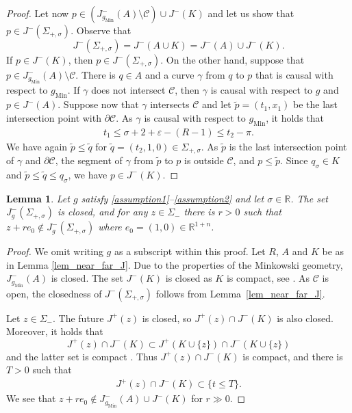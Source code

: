 \documentclass[11pt,letterpaper]{amsart}
\newtheorem{Lemma}[Theorem]{Lemma}
\theoremstyle{definition}
\numberwithin{equation}{section}
\newcommand{\eps}{\varepsilon}
\newcommand{\p}{\partial}
\newcommand{\gm}{g_{\mathrm{Min}}}
\def\p{\partial}
\def\R{\mathbb R}
\begin{document}
\begin{proof}
Let now $p \in (J_{\gm}^-(A) \setminus \mathcal C) \cup J^-(K)$
and let us show that $p \in J^-(\Sigma_{+,\sigma})$. Observe that 
\[
J^-(\Sigma_{+,\sigma}) = J^-(A \cup K) = J^-(A) \cup J^-(K).
\]
If $p \in J^-(K)$, then $p \in J^-(\Sigma_{+,\sigma})$. On the other hand, suppose that 
$p \in J_{\gm}^-(A) \setminus \mathcal C$.
There is $q \in A$ and a curve $\gamma$ from $q$ to $p$ that is causal with respect to $\gm$. 
If $\gamma$ does not intersect $\mathcal C$, then $\gamma$ is causal with respect to $g$ and $p \in J^-(A)$.
Suppose now that $\gamma$ intersects $\mathcal C$ and let $\tilde p = (t_1,x_1)$ be the last intersection point with $\p \mathcal C$. As $\gamma$ is causal with respect to $\gm$, it holds that 
    \begin{align*}
t_1 \leq \sigma + 2 + \eps - (R-1) \leq t_2 - \pi.
    \end{align*}
We have again $\tilde p \le \tilde q$ for $\tilde q = (t_2, 1, 0) \in \Sigma_{+,\sigma}$. As $\tilde p$ is the last intersection point of $\gamma$ and $\p \mathcal C$, the segment of $\gamma$ from $\tilde p$ to $p$ is outside $\mathcal C$, and $p \le \tilde p$.
Since $q_\sigma \in K$ and $\tilde p \le \tilde q \le q_\sigma$, we have $p \in J^-(K)$.
\end{proof}


\begin{Lemma}\label{lem_cl_bdd}
Let $g$ satisfy \eqref{assumption1}--\eqref{assumption2} and let $\sigma \in \R$.
The set $J_{g}^-(\Sigma_{+,\sigma})$ is closed, and 
for any $z \in \Sigma_-$ there is $r > 0$ such that 
$z + r e_0 \not\in J_{g}^-(\Sigma_{+,\sigma})$ where $e_0 = (1,0) \in \R^{1+n}$. 
\end{Lemma}
\begin{proof}
We omit writing $g$ as a subscript within this proof. 
Let $R$, $A$ and $K$ be as in Lemma \ref{lem_near_far_J}.
Due to the properties of the Minkowski geometry, $J_{\gm}^-(A)$ is closed. 
The set $J^-(K)$ is closed as $K$ is compact, see \cite[Theorem 2.1]{hounnonkpe2019}.  
As $\mathcal C$ is open, the closedness of $J^-(\Sigma_{+,\sigma})$ follows from Lemma~\ref{lem_near_far_J}. 

Let $z \in \Sigma_-$. The future $J^+(z)$ is closed, so $J^+(z) \cap J^-(K)$ is also closed. Moreover, it holds that 
\[
J^+(z) \cap J^-(K) \subset J^+(K \cup \{z\}) \cap J^-(K \cup \{z\})
\]
and the latter set is compact \cite[Proposition 2.3]{hounnonkpe2019}. Thus $J^+(z) \cap J^-(K)$ is compact, and there is $T > 0$ such that
    \begin{align*}
 J^+(z) \cap J^-(K) \subset \{t \le T\}.
    \end{align*}
We see that $z + r e_0 \not\in J_{\gm}^-(A) \cup J^-(K)$ for $r \gg 0$.
\end{proof}
\end{document}
